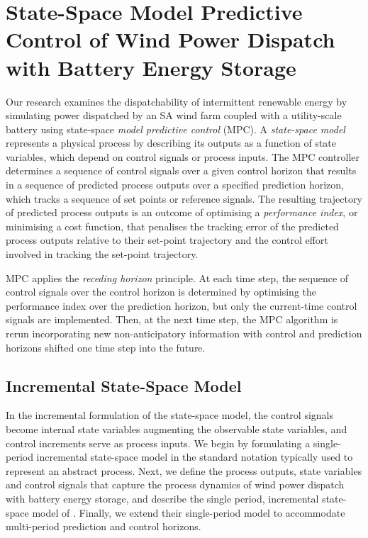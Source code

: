 \documentclass[a4paper, 10pt, twocolumn, preprint, 3p]{elsarticle}
\begin{document}
\section{State-Space Model Predictive Control of Wind Power Dispatch with Battery Energy Storage}\label{sect:ssmpc_dispatch}
Our research examines the dispatchability of intermittent renewable energy by simulating power dispatched by an SA wind farm coupled with a utility-scale battery using state-space \textit{model predictive control} (MPC).  A \textit{state-space model} represents a physical process by describing its outputs as a function of state variables, which depend on control signals or process inputs.  The MPC controller determines a sequence of control signals over a given control horizon that results in a sequence of predicted process outputs over a specified prediction horizon, which tracks a sequence of set points or reference signals.  The resulting trajectory of predicted process outputs is an outcome of optimising a \textit{performance index}, or minimising a cost function, that penalises the tracking error of the predicted process outputs relative to their set-point trajectory and the control effort involved in tracking the set-point trajectory.

MPC applies the \textit{receding horizon} principle.  At each time step, the sequence of control signals over the control horizon is determined by optimising the performance index over the prediction horizon, but only the current-time control signals are implemented.  Then, at the next time step, the MPC algorithm is rerun incorporating new non-anticipatory information with control and prediction horizons shifted one time step into the future.

\subsection{Incremental State-Space Model}\label{sect:state_space_model}
In the incremental formulation of the state-space model, the control signals become internal state variables augmenting the observable state variables, and control increments serve as process inputs.  We begin by formulating a single-period incremental state-space model in the standard notation typically used to represent an abstract process.  Next, we define the process outputs, state variables and control signals that capture the process dynamics of wind power dispatch with battery energy storage, and describe the single period, incremental state-space model of \cite{TREB16}.  Finally, we extend their single-period model to accommodate multi-period prediction and control horizons.
\end{document}
